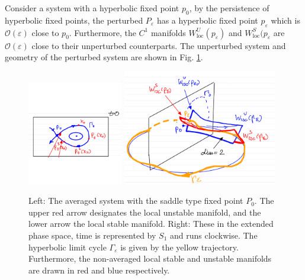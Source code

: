 \begin{ex}
	Consider a system with a hyperbolic fixed point $p_0$, by the persistence of hyperbolic fixed points, the perturbed $P_\varepsilon$ has a hyperbolic fixed point $p_\varepsilon$ which is $\mathcal{O}(\varepsilon)$ close to $p_0$. Furthermore, the $C^{1}$ manifolds $W^{U}_{ \textrm{loc} }(p_\varepsilon)$ and $W^{S}_{ \textrm{loc} }(p_{\varepsilon}$ are $\mathcal{O}(\varepsilon)$ close to their unperturbed counterparts. The unperturbed system and geometry of the perturbed system are shown in Fig. \ref{fig:avg_ex_2}.
	\begin{figure}[h!]
		\centering
		\includegraphics[width=0.37\textwidth]{figures/ch5/4avg_ex_2a.png}
		\includegraphics[width=0.6\textwidth]{figures/ch5/5avg_ex_2b.png}
		\caption{Left: The averaged system with the saddle type fixed point $P_0$. The upper red arrow designates the local unstable manifold, and the lower arrow the local stable manifold. Right: These in the extended phase space, time is represented by $S_1$ and runs clockwise. The hyperbolic limit cycle $\Gamma_\varepsilon$ is given by the yellow trajectory. Furthermore, the non-averaged local stable and unstable manifolds are drawn in red and blue respectively.}
		\label{fig:avg_ex_2}
	\end{figure}
	
\end{ex}
